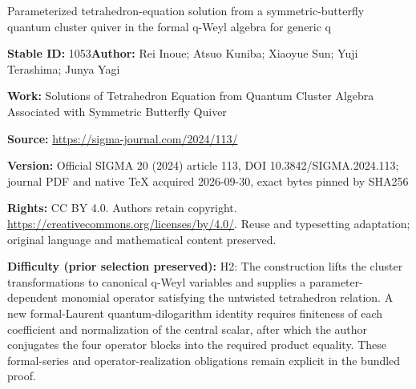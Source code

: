 \documentclass[11pt]{article}
\numberwithin{equation}{section}
\numberwithin{equation}{section}
\begin{document}
\begin{center}\Large Parameterized tetrahedron-equation solution from a symmetric-butterfly quantum cluster quiver in the formal q-Weyl algebra for generic q\end{center}
\noindent\textbf{Stable ID:} 1053\quad\textbf{Author:} Rei Inoue; Atsuo Kuniba; Xiaoyue Sun; Yuji Terashima; Junya Yagi\par
\noindent\textbf{Work:} Solutions of Tetrahedron Equation from Quantum Cluster Algebra Associated with Symmetric Butterfly Quiver\par
\noindent\textbf{Source:} \url{https://sigma-journal.com/2024/113/}\par
\noindent\textbf{Version:} Official SIGMA 20 (2024) article 113, DOI 10.3842/SIGMA.2024.113; journal PDF and native TeX acquired 2026-09-30, exact bytes pinned by SHA256\par
\noindent\textbf{Rights:} CC BY 4.0. Authors retain copyright. \url{https://creativecommons.org/licenses/by/4.0/}. Reuse and typesetting adaptation; original language and mathematical content preserved.\par
\noindent\textbf{Difficulty (prior selection preserved):} {\CJKfont H2: The construction lifts the cluster transformations to canonical q-Weyl variables and supplies a parameter-dependent monomial operator satisfying the untwisted tetrahedron relation. A new formal-Laurent quantum-dilogarithm identity requires finiteness of each coefficient and normalization of the central scalar, after which the author conjugates the four operator blocks into the required product equality. These formal-series and operator-realization obligations remain explicit in the bundled proof.}\par
\end{document}
